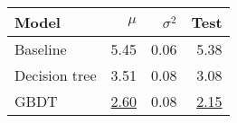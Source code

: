 \begin{tabular}{lrrr}
  \toprule
  Model         & $\mu$            & $\sigma^2$ & Test
  \\
  \midrule
  Baseline      & 5.45             & 0.06       & 5.38
  \\
  Decision tree & 3.51             & 0.08       & 3.08
  \\
  GBDT          & \underline{2.60} & 0.08       & \underline{2.15}
  \\
  \bottomrule
\end{tabular}

